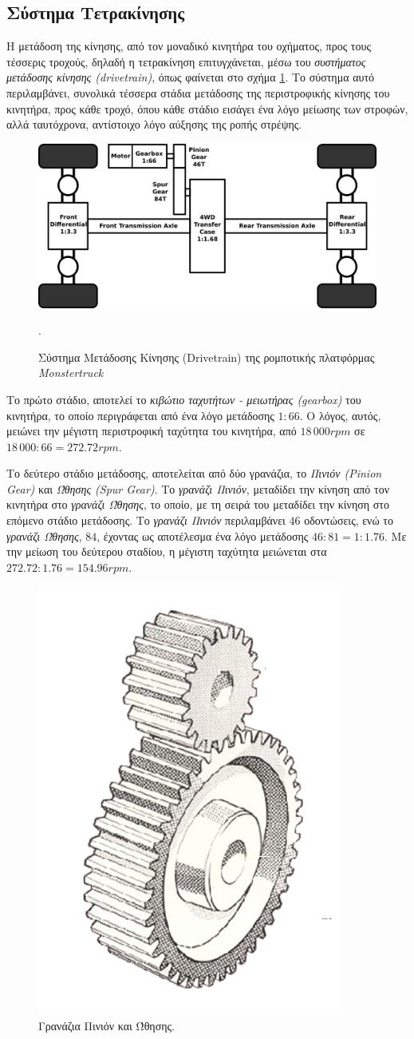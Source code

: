 \bigskip
\subsection{Σύστημα Τετρακίνησης}
Η μετάδοση της κίνησης, από τον μοναδικό κινητήρα του οχήματος, προς τους τέσσερις τροχούς, δηλαδή η τετρακίνηση επιτυγχάνεται, μέσω του \textit{συστήματος μετάδοσης κίνησης (drivetrain)}, όπως φαίνεται στο σχήμα \ref{fig:drivetrain}. Το σύστημα αυτό περιλαμβάνει, συνολικά τέσσερα στάδια μετάδοσης της περιστροφικής κίνησης του κινητήρα, προς κάθε τροχό, όπου κάθε στάδιο εισάγει ένα λόγο μείωσης των στροφών, αλλά ταυτόχρονα, αντίστοιχο λόγο αύξησης της ροπής στρέψης.

\bigskip
\begin{figure}[!ht]
	\centering
	\includegraphics[width=0.8\linewidth]{Chapters/Chapter2/Figures/drivetrain.png}
	\caption{Σύστημα Μετάδοσης Κίνησης (Drivetrain) της ρομποτικής πλατφόρμας \textit{Monstertruck}}.
	\label{fig:drivetrain}
\end{figure}

\bigskip
Το πρώτο στάδιο, αποτελεί το \textit{κιβώτιο ταχυτήτων - μειωτήρας (gearbox)} του κινητήρα, το οποίο περιγράφεται από ένα λόγο μετάδοσης $1:66$. Ο λόγος, αυτός, μειώνει την μέγιστη περιστροφική ταχύτητα του κινητήρα, από $18\,000rpm$ σε $18\,000:66=272.72rpm$.

\bigskip
Το δεύτερο στάδιο μετάδοσης, αποτελείται από δύο γρανάζια, το \textit{Πινιόν (Pinion Gear)} και \textit{Ώθησης (Spur Gear)}. Το \textit{γρανάζι Πινιόν}, μεταδίδει την κίνηση από τον κινητήρα στο \textit{γρανάζι Ώθησης}, το οποίο, με τη σειρά του μεταδίδει την κίνηση στο επόμενο στάδιο μετάδοσης. Το \textit{γρανάζι Πινιόν} περιλαμβάνει $46$ οδοντώσεις, ενώ το \textit{γρανάζι Ώθησης}, $84$, έχοντας ως αποτέλεσμα ένα λόγο μετάδοσης $46:81=1:1.76$. Με την μείωση του δεύτερου σταδίου, η μέγιστη ταχύτητα μειώνεται στα $272.72:1.76 = 154.96rpm$.

\begin{figure}[!ht]
	\centering
	\includegraphics[width=0.2\linewidth]{Chapters/Chapter2/Figures/spur_pinion_gears.png}
	\caption{Γρανάζια Πινιόν και Ώθησης.}
	\label{fig:spur_pinion_gears}
\end{figure}

